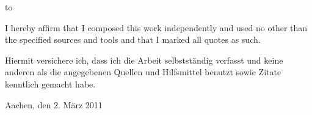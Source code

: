 \thispagestyle{empty}
\vspace*{36\baselineskip}
\hbox to \textwidth{\hrulefill}

I hereby affirm that I composed this work independently and used no other than the specified sources and tools and that I marked all quotes as such.

Hiermit versichere ich, dass ich die Arbeit selbstständig verfasst und keine anderen als die angegebenen Quellen und Hilfsmittel benutzt sowie Zitate kenntlich gemacht habe.

Aachen, den 2. März 2011
